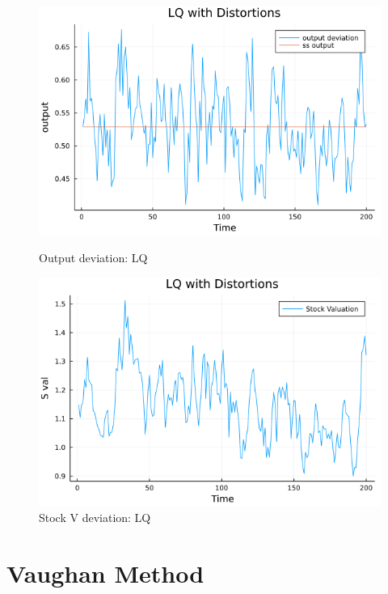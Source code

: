 \documentclass[12pt]{article}
\begin{document}
\begin{figure}[h]
        \begin{minipage}{0.45\textwidth}
        \centering
        \includegraphics[width=1\textwidth]{y_dev_LQ_new.png} %
        \caption{Output deviation: LQ}\label{LQ_sim}
    \end{minipage}\hfill
    \begin{minipage}{0.45\textwidth}
        \centering
        \includegraphics[width=1\textwidth]{stock_dev_LQ_new.png} %
        \caption{Stock V deviation: LQ}\label{LQ_sim}
    \end{minipage}
\end{figure}


\section{Vaughan Method}
\end{document}
